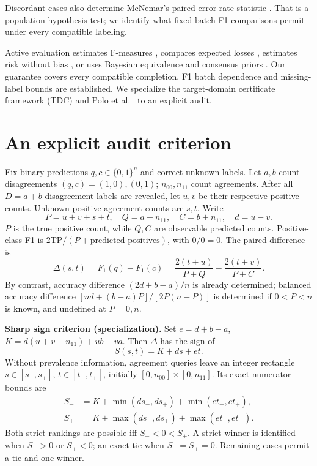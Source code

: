 \documentclass[a4paper]{esannV2}
\newcommand{\F}{F_1}
\begin{document}
Discordant cases also determine McNemar's paired error-rate statistic
\cite{dietterich1998}. That is a population hypothesis test; we identify what
fixed-batch F1 comparisons permit under every compatible labeling.

Active evaluation estimates F-measures \cite{sawade2010}, compares expected
losses \cite{sawade2012}, estimates risk without bias \cite{kossen2021}, or uses
Bayesian equivalence and consensus priors \cite{ji2021,kay2025}. Our guarantee
covers every compatible completion. F1 batch dependence \cite{lipton2014} and
missing-label bounds \cite{dervovic2025} are established. We specialize the
target-domain certificate framework (TDC) \cite{tdc} and Polo et al.\
\cite{polo2024} to an explicit audit.

\section{An explicit audit criterion}
Fix binary predictions $q,c\in\{0,1\}^n$ and correct unknown labels.
Let $a,b$ count disagreements $(q,c)=(1,0),(0,1)$;
$n_{00},n_{11}$ count agreements. After all $D=a+b$ disagreement labels are
revealed, let $u,v$ be their respective positive counts. Unknown positive
agreement counts are $s,t$. Write
\[
 P=u+v+s+t,\quad Q=a+n_{11},\quad C=b+n_{11},\quad d=u-v.
\]
$P$ is the true positive count, while $Q,C$ are observable predicted counts.
Positive-class F1 is $2\mathrm{TP}/(P+\text{predicted positives})$, with
$0/0=0$. The paired difference is
\begin{equation}\label{eq:gap}
 \Delta(s,t)=\F(q)-\F(c)=\frac{2(t+u)}{P+Q}-\frac{2(t+v)}{P+C}.
\end{equation}
By contrast, accuracy difference $(2d+b-a)/n$ is already determined;
balanced accuracy difference $[nd+(b-a)P]/[2P(n-P)]$ is determined if
$0<P<n$ is known, and undefined at $P=0,n$.

\noindent\textbf{Sharp sign criterion (specialization).}
Set $e=d+b-a$, $K=d(u+v+n_{11})+ub-va$. Then $\Delta$ has the sign of
\begin{equation}\label{eq:affine}
 S(s,t)=K+ds+et.
\end{equation}
Without prevalence information, agreement queries leave an integer rectangle
$s\in[s_-,s_+]$, $t\in[t_-,t_+]$, initially $[0,n_{00}]\times[0,n_{11}]$.
Its exact numerator bounds are
\begin{align}\label{eq:bounds}
 S_-&=K+\min(ds_-,ds_+)+\min(et_-,et_+),\nonumber\\
 S_+&=K+\max(ds_-,ds_+)+\max(et_-,et_+).
\end{align}
Both strict rankings are possible iff $S_-<0<S_+$. A strict winner is
identified when $S_->0$ or $S_+<0$; an exact tie when $S_-=S_+=0$.
Remaining cases permit a tie and one winner.
\end{document}
